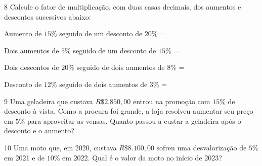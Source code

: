 
\num{8} Calcule o fator de multiplicação, com duas casas decimais, dos
aumentos e descontos sucessivos abaixo:
    
\begin{escolha}[itemsep=0pt]
    \item Aumento de $15\%$ seguido de um desconto de $20\%$  =  \\
    \item Dois aumentos de $5\%$ seguido de um desconto de $15\%$  =  \\
    \item Dois descontos de $20\%$ seguido de dois aumentos de $8\%$  =  \\
    \item Desconto de $12\%$ seguido de dois aumentos de $3\%$  =  
\end{escolha}

\pagebreak
\num{9} Uma geladeira que custava $R\$2.850,00$ entrou na promoção com $15\%$ de
desconto à vista. Como a procura foi grande, a loja resolveu aumentar
seu preço em $5\%$ para aproveitar as vensas. Quanto passou a custar a
geladeira após o desconto e o aumento?


\num{10} Uma moto que, em 2020, custava $R\$8.100,00$ sofreu uma desvalorização
de $5\%$ em 2021 e de $10\%$ em 2022. Qual é o valor da moto no início de
2023?

